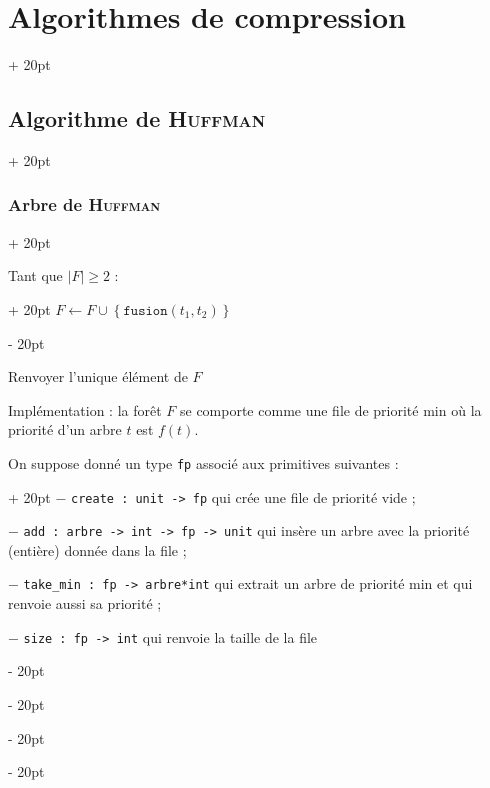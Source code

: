 \documentclass[a4paper, 12pt, twoside]{article}
\newcommand{\set}[1]{\left\{ #1 \right\}}
\newcommand{\abs}[1]{\left\lvert #1 \right\rvert}
\renewcommand{\ge}{\geqslant}
\newcommand{\ind}[1][20pt]{\advance\leftskip + #1}
\newcommand{\deind}[1][20pt]{\advance\leftskip - #1}
\newenvironment{indt}[2][20pt]{#2 \par \ind[#1]}{\par \deind} %
\begin{document}
\begin{indt}{\section{Algorithmes de compression}}
\begin{indt}{\subsection{Algorithme de \textsc{Huffman}}}
\begin{indt}{\subsubsection{Arbre de \textsc{Huffman}}}
\begin{pseudocode}
\begin{indt}{Tant que $\abs F \ge 2$ :}
                        $F \leftarrow F \cup \set{\mathtt{fusion}(t_1, t_2)}$
                    \end{indt}

                    \vspace{6pt}
                    
                    Renvoyer l'unique élément de $F$
                \end{pseudocode}

                \vspace{6pt}
                
                Implémentation : la forêt $F$ se comporte comme une file de priorité min où la priorité d'un arbre $t$ est $f(t)$.

                \begin{indt}{On suppose donné un type \texttt{fp} associé aux primitives suivantes :}
                    $-$ \texttt{create : unit -> fp} qui crée une file de priorité vide ;

                    $-$ \texttt{add : arbre -> int -> fp -> unit} qui insère un arbre avec la priorité (entière) donnée dans la file ;

                    $-$ \texttt{take\_min : fp -> arbre*int} qui extrait un arbre de priorité min et qui renvoie aussi sa priorité ;

                    $-$ \texttt{size : fp -> int} qui renvoie la taille de la file
                \end{indt}
            \end{indt}
        \end{indt}
    \end{indt}
    
    
    
\end{document}

